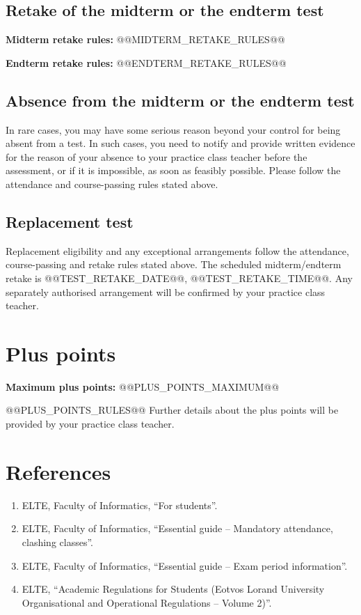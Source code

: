 \documentclass[11pt,a4paper]{article}
\newcommand{\field}[2]{\textbf{#1:} #2\par}
\begin{document}
\subsection*{Retake of the midterm or the endterm test}
\field{Midterm retake rules}{@@MIDTERM_RETAKE_RULES@@}
\field{Endterm retake rules}{@@ENDTERM_RETAKE_RULES@@}

\subsection*{Absence from the midterm or the endterm test}
In rare cases, you may have some serious reason beyond your control for being
absent from a test. In such cases, you need to notify and provide written evidence
for the reason of your absence to your practice class teacher before the
assessment, or if it is impossible, as soon as feasibly possible.
Please follow the attendance and course-passing rules stated above.

\subsection*{Replacement test}
Replacement eligibility and any exceptional arrangements follow the attendance,
course-passing and retake rules stated above. The scheduled midterm/endterm retake
is @@TEST_RETAKE_DATE@@, @@TEST_RETAKE_TIME@@. Any separately authorised arrangement
will be confirmed by your practice class teacher.

\section*{Plus points}
\field{Maximum plus points}{@@PLUS_POINTS_MAXIMUM@@}
@@PLUS_POINTS_RULES@@
Further details about the plus points will be provided by your practice class teacher.

\section*{References}
\begin{enumerate}
\item ELTE, Faculty of Informatics, ``For students''.
\item ELTE, Faculty of Informatics, ``Essential guide -- Mandatory attendance, clashing classes''.
\item ELTE, Faculty of Informatics, ``Essential guide -- Exam period information''.
\item ELTE, ``Academic Regulations for Students (Eotvos Lorand University
Organisational and Operational Regulations -- Volume 2)''.
\end{enumerate}
\end{document}
